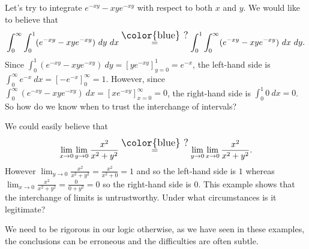 \begin{example*}
  Let's try to integrate \(e^{-xy} - xye^{-xy}\) with respect to both \(x\) and \(y\).
  We would like to believe that
  \[
    \int_{0}^{\infty} \int_{0}^{1} (e^{-xy} - xye^{-xy}) \ dy \ dx
    \overset{\text{\large\color{blue} ?}}{=} \int_{0}^{1} \int_{0}^{\infty}  (e^{-xy} - xye^{-xy}) \ dx \ dy.
  \]
  Since
  \( \int_{0}^{1} (e^{-xy} - xye^{-xy}) \ dy = \left[ ye^{-xy} \right]_{y=0}^{1} = e^{-x}\),
  the left-hand side is
  \( \int_{0}^{\infty} e^{-x} \ dx = \left[ -e^{-x} \right]_{0}^{\infty} = 1 \).
  However, since
  \( \int_{0}^{\infty}  (e^{-xy} - xye^{-xy}) \ dx = \left[ xe^{-xy} \right]_{x=0}^{\infty} = 0\),
  the right-hand side is \(\int_{0}^{1} 0 \ dx = 0\).
  So how do we know when to trust the interchange of intervals?
\end{example*}


\begin{example*}
  We could easily believe that
  \[
    \lim_{x\to 0}\lim_{y\to 0} \frac{x^2}{x^2 + y^2}
    \overset{\text{\large\color{blue} ?}}{=}
    \lim_{y\to 0}\lim_{x\to 0} \frac{x^2}{x^2 + y^2}.
  \]
  However \(\lim_{y\to 0} \frac{x^2}{x^2 + y^2} = \frac{x^2}{x^2 + 0} = 1 \) and so the left-hand side is \(1\)
  whereas \(\lim_{x\to 0} \frac{x^2}{x^2 + y^2} = \frac{0}{0 + y^2} = 0\) so the right-hand side is \(0\).
  This example shows that the interchange of limits is untrustworthy. Under what circumstances is it legitimate?
\end{example*}

We need to be rigorous in our logic otherwise, as we have seen in these examples, the conclusions can be erroneous and the difficulties are often subtle.

